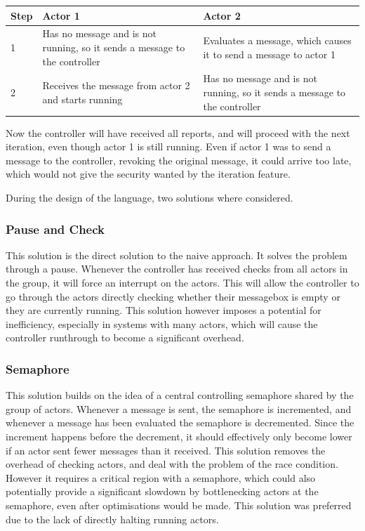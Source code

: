 \begin{tabular}{ | p{1cm} | p{6cm} | p{6cm} | }%
\hline
Step & Actor 1 & Actor 2 \\\hline
1 & Has no message and is not running, so it sends a message to the controller & Evaluates a message, which causes it to send a message to actor 1 \\\hline
2 & Receives the message from actor 2 and starts running & Has no message and is not running, so it sends a message to the controller \\\hline
\end{tabular}

Now the controller will have received all reports, and will proceed with the next iteration, even though actor 1 is still running. Even if actor 1 was to send a message to the controller, revoking the original message, it could arrive too late, which would not give the security wanted by the iteration feature.

During the design of the language, two solutions where considered.

\subsubsection{Pause and Check}

This solution is the direct solution to the naive approach. It solves the problem through a pause. Whenever the controller has received checks from all actors in the group, it will force an interrupt on the actors. This will allow the controller to go through the actors directly checking whether their messagebox is empty or they are currently running. This solution however imposes a potential for inefficiency, especially in systems with many actors, which will cause the controller runthrough to become a significant overhead.

\subsubsection{Semaphore}

This solution builds on the idea of a central controlling semaphore shared by the group of actors. Whenever a message is sent, the semaphore is incremented, and whenever a message has been evaluated the semaphore is decremented. Since the increment happens before the decrement, it should effectively only become lower if an actor sent fewer messages than it received. This solution removes the overhead of checking actors, and deal with the problem of the race condition. However it requires a critical region with a semaphore, which could also potentially provide a significant slowdown by bottlenecking actors at the semaphore, even after optimisations would be made. This solution was preferred due to the lack of directly halting running actors.

